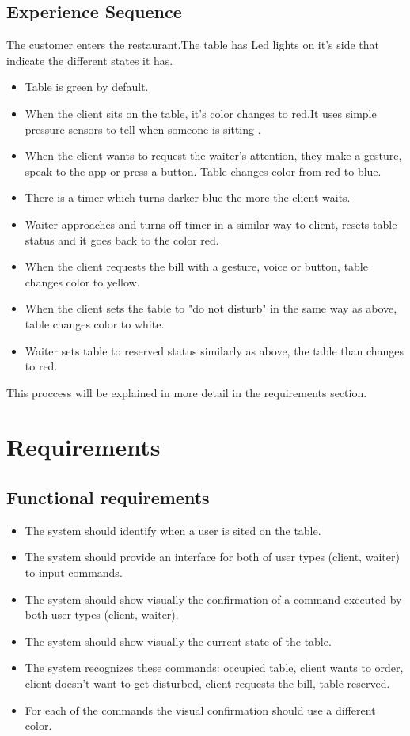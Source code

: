 \documentclass{article}
\begin{document}
\subsection{Experience Sequence }
The customer enters the restaurant.The table has Led lights on it's side that indicate the different states it has.
\begin{itemize}
    \item Table is green by default.
    \item  When the client sits on the table, it's color changes to red.It uses simple pressure sensors to tell when someone is sitting \cite{cheng2013smart}.
    \item When the client wants to request the waiter's attention, they make a gesture, speak to the app or press a button. 
    Table changes color from  red to blue.
    \item  There is  a timer which turns darker blue the more the client waits.
    \item Waiter approaches and turns off timer in a similar way to client, resets table status and it goes back to the color red.
    \item When the client requests the bill with a gesture, voice or button, table changes color to yellow.
    \item When the client sets the table to "do not disturb" in the same way as above, table changes color to white.
    \item Waiter sets table to reserved status similarly as above, the table than changes to red.
\end{itemize}
This proccess will be explained in more detail in the requirements section.
\section{Requirements}
\subsection{Functional requirements}
\begin{itemize}
    \item The system should identify when a user is sited on the table.
    \item The system should provide an interface for both of user types (client, waiter) to input commands.
    \item The system should show visually the confirmation of a command executed by both user types (client, waiter).
    \item The system should show visually the current state of the table.
    \item The system recognizes these commands: occupied table, client wants to order, client doesn’t want to get disturbed, client requests the bill, table reserved.
    \item For each of the commands the visual confirmation should use a different color.
\end{itemize}
\end{document}
